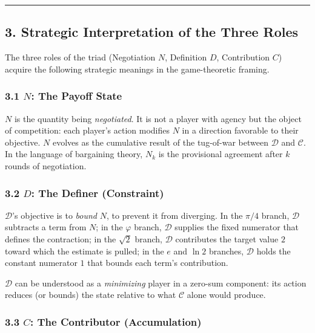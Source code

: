 \documentclass[
  11pt,
  letterpaper,
]{article}
\begin{document}
\begin{center}\rule{0.5\linewidth}{0.5pt}\end{center}

\subsection{3. Strategic Interpretation of the Three
Roles}\label{strategic-interpretation-of-the-three-roles}

The three roles of the triad (Negotiation \(N\), Definition \(D\),
Contribution \(C\)) acquire the following strategic meanings in the
game-theoretic framing.

\subsubsection{\texorpdfstring{3.1 \(N\): The Payoff
State}{3.1 N: The Payoff State}}\label{n-the-payoff-state}

\(N\) is the quantity being \emph{negotiated}. It is not a player with
agency but the object of competition: each player's action modifies
\(N\) in a direction favorable to their objective. \(N\) evolves as the
cumulative result of the tug-of-war between \(\mathcal{D}\) and
\(\mathcal{C}\). In the language of bargaining theory, \(N_k\) is the
provisional agreement after \(k\) rounds of negotiation.

\subsubsection{\texorpdfstring{3.2 \(D\): The Definer
(Constraint)}{3.2 D: The Definer (Constraint)}}\label{d-the-definer-constraint}

\(\mathcal{D}\)'s objective is to \emph{bound} \(N\), to prevent it from
diverging. In the \(\pi/4\) branch, \(\mathcal{D}\) subtracts a term
from \(N\); in the \(\varphi\) branch, \(\mathcal{D}\) supplies the
fixed numerator that defines the contraction; in the \(\sqrt{2}\)
branch, \(\mathcal{D}\) contributes the target value \(2\) toward which
the estimate is pulled; in the \(e\) and \(\ln 2\) branches,
\(\mathcal{D}\) holds the constant numerator \(1\) that bounds each
term's contribution.

\(\mathcal{D}\) can be understood as a \emph{minimizing} player in a
zero-sum component: its action reduces (or bounds) the state relative to
what \(\mathcal{C}\) alone would produce.

\subsubsection{\texorpdfstring{3.3 \(C\): The Contributor
(Accumulation)}{3.3 C: The Contributor (Accumulation)}}\label{c-the-contributor-accumulation}
\end{document}

